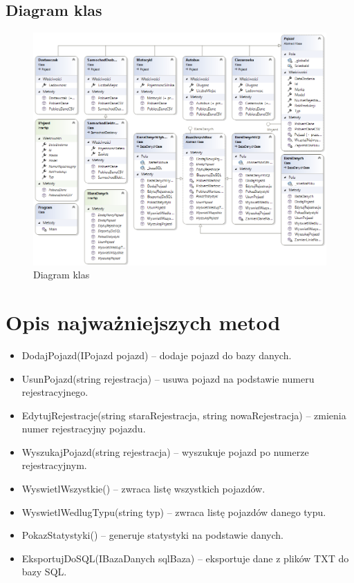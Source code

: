 \subsection*{Diagram klas}
\clearpage
\begin{figure}[h] 
    \centering
    \includegraphics[width=1\textwidth]{Diagram klas.png}
    \caption{Diagram klas}
    \label{fig:moj_obrazek}
\end{figure}
\section{Opis najważniejszych metod}
\begin{itemize}
    \item DodajPojazd(IPojazd pojazd) – dodaje pojazd do bazy danych.
    \item UsunPojazd(string rejestracja) – usuwa pojazd na podstawie numeru rejestracyjnego.
    \item EdytujRejestracje(string staraRejestracja, string nowaRejestracja) – zmienia numer rejestracyjny pojazdu.
    \item WyszukajPojazd(string rejestracja) – wyszukuje pojazd po numerze rejestracyjnym.
    \item WyswietlWszystkie() – zwraca listę wszystkich pojazdów.
    \item WyswietlWedlugTypu(string typ) – zwraca listę pojazdów danego typu.
    \item PokazStatystyki() – generuje statystyki na podstawie danych.
    \item EksportujDoSQL(IBazaDanych sqlBaza) – eksportuje dane z plików TXT do bazy SQL.
\end{itemize}